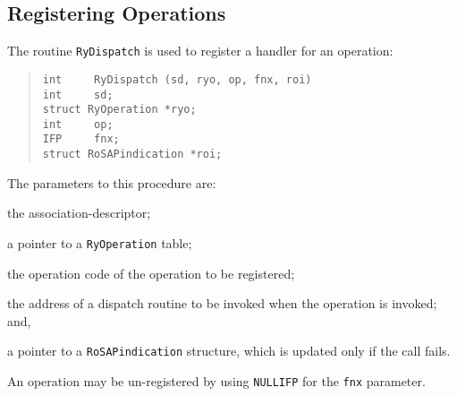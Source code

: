 \subsection	{Registering Operations}\label{librosy:register}
The routine \verb"RyDispatch" is used to register a handler for an operation:
\begin{quote}\small\begin{verbatim}
int     RyDispatch (sd, ryo, op, fnx, roi)
int     sd;
struct RyOperation *ryo;
int     op;
IFP     fnx;
struct RoSAPindication *roi;
\end{verbatim}\end{quote}
The parameters to this procedure are:
\begin{describe}
\item[\verb"sd":] the association-descriptor;

\item[\verb"ryo":] a pointer to a \verb"RyOperation" table;

\item[\verb"op":] the operation code of the operation to be registered;

\item[\verb"fnx":] the address of a dispatch routine to be invoked when
the operation is invoked;
and,

\item[\verb"roi":] a pointer to a \verb"RoSAPindication" structure,
which is updated only if the call fails.
\end{describe}
An operation may be un-registered by using \verb"NULLIFP" for the \verb"fnx"
parameter.

